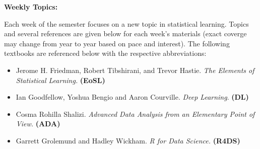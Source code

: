 \documentclass[12pt]{article}
\begin{document}



\vspace{0.4cm}



\newpage

\textbf{Weekly Topics:} \vspace{6pt}

Each week of the semester focuses on a new topic in statistical
learning. Topics and several references are given below for each
week's materials (exact coverge may change from year to year
based on pace and interest). The following textbooks are referenced
below with the respective abbreviations:

\begin{itemize}
\item Jerome H. Friedman, Robert Tibshirani, and Trevor Hastie. \textit{The Elements of Statistical Learning.} \textbf{(EoSL)}
\item Ian Goodfellow, Yoshua Bengio and Aaron Courville. \textit{Deep Learning}. \textbf{(DL)}
\item Cosma Rohilla Shalizi. \textit{Advanced Data Analysis from an Elementary Point of View.} \textbf{(ADA)}
\item Garrett Grolemund and Hadley Wickham. \textit{R for Data Science.} \textbf{(R4DS)}
\end{itemize}
\end{document}
